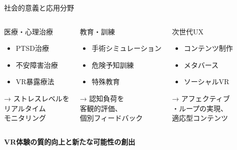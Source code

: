 \documentclass[aspectratio=169,10pt]{beamer}
\begin{document}
\begin{frame}{社会的意義と応用分野}
\begin{columns}[T]
\begin{block}{医療・心理治療}
\begin{itemize}
\item PTSD治療
\item 不安障害治療
\item VR暴露療法
\end{itemize}
\vspace{0.2cm}
→ ストレスレベルを\\
\quad リアルタイム\\
\quad モニタリング
\end{block}

\begin{block}{教育・訓練}
\begin{itemize}
\item 手術シミュレーション
\item 危険予知訓練
\item 特殊教育
\end{itemize}
\vspace{0.2cm}
→ 認知負荷を\\
\quad 客観的評価、\\
\quad 個別フィードバック
\end{block}

\begin{block}{次世代UX}
\begin{itemize}
\item コンテンツ制作
\item メタバース
\item ソーシャルVR
\end{itemize}
\vspace{0.2cm}
→ アフェクティブ\\
\quad ・ループの実現、\\
\quad 適応型コンテンツ
\end{block}
\end{columns}

\vspace{0.5cm}
\begin{center}
\Large
\textbf{VR体験の質的向上と新たな可能性の創出}
\end{center}
\end{frame}
\end{document}
